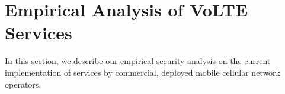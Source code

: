 \chapter{Empirical Analysis of VoLTE Services}
\label{sec:anal}
In this section, we describe our empirical security analysis
on the current implementation of \vt services by commercial,
deployed mobile cellular network operators.

